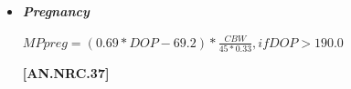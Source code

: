 \begin{refsection}
\begin{itemize}
            {\raggedleft \textbf{[AN.NRC.32]}\par}

            
        
        \underline {Heifers}
        \vspace{0.2cm}

\begin{center}
    \(Npg = 0, if ADG = 0 ADG * (268 - 29.4 * \frac{NEg}{ADG})\)
\end{center}

\vspace{0.5cm}
            {\raggedleft \textbf{[AN.NRC.33]}\par}
        \vspace{0.2cm}

\begin{center}
    \(EffMP\_NPg = \frac{(83.4 - 0.114 * EQSBW)}{100}, if EQSBW \leq 478, 0
    .28908\)
\end{center}
\vspace{0.5cm}

            {\raggedleft \textbf{[AN.NRC.34]}\par}
\textit{\small Otherwise}
        \vspace{0.2cm}

\begin{center}
    \(MPg = \frac{NPg}{EffMP\_NPg}\)
\end{center}
\vspace{0.5cm}

            {\raggedleft \textbf{[AN.NRC.35]}\par}
\vspace{0.2cm}

\begin{center}
    \(MPreq = MPm + MPg + MPpreg + MPlact\)
\end{center}

\vspace{0.5cm}
            {\raggedleft \textbf{[AN.NRC.36]}\par}
            
\vspace{0.5cm}
                \item \textbf{\textit{Pregnancy}}
\vspace{0.2cm}

\begin{center}
    \(MPpreg = (0.69 * DOP - 69.2) * \frac{CBW}{45 * 0.33}, if DOP > 190.0\)
\end{center}

\vspace{0.5cm}
            {\raggedleft \textbf{[AN.NRC.37]}\par}
\vspace{0.25cm}
            

\end{itemize}
\end{refsection}
